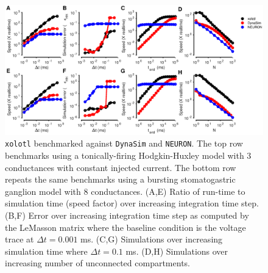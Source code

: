 \documentclass{frontiersSCNS} %
\begin{document}
\begin{figure}
	\centering
	\includegraphics[width=1.0\linewidth]{gfx/figure_benchmark}
	\caption{\texttt{xolotl} benchmarked against \texttt{DynaSim} and \texttt{NEURON}. The top row benchmarks using a tonically-firing Hodgkin-Huxley model with 3 conductances with constant injected current. The bottom row repeats the same benchmarks using a bursting stomatogastric ganglion model with 8 conductances. (A,E) Ratio of run-time to simulation time (speed factor) over increasing integration time step. (B,F) Error over increasing integration time step as computed by the LeMasson matrix where the baseline condition is the voltage trace at $\Delta t = 0.001$ ms. (C,G) Simulations over increasing simulation time where $\Delta t = 0.1$ ms. (D,H) Simulations over increasing number of unconnected compartments.}
	\label{fig:figurebenchmark}
\end{figure}
\end{document}
